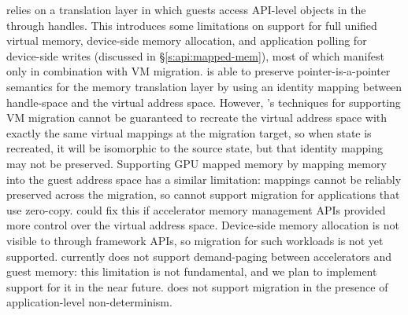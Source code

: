 \Model relies on a translation layer in which guests access API-level objects in the \worker through handles.
This introduces some limitations on support for full unified virtual memory, device-side memory allocation, and application polling for
device-side writes (discussed in \S\ref{s:api:mapped-mem}), most of which manifest only in combination with
VM migration.
\Model is able to preserve pointer-is-a-pointer semantics for the memory translation
layer by using an identity mapping between handle-space and the \worker virtual address space.
However, \model's techniques
for supporting VM migration cannot be guaranteed to recreate the \worker virtual address space with exactly the same virtual mappings at the migration target,
so when state is recreated, it will be isomorphic to the source state, but that identity mapping may not be preserved. Supporting GPU mapped memory by mapping \worker memory into the
guest address space has a similar limitation: mappings cannot be reliably preserved across the migration, so \model cannot support migration for applications that use zero-copy.
\Model could fix this if accelerator memory management APIs provided more control over the virtual address space.
Device-side memory allocation is not visible to \model through framework APIs, so migration for such workloads
is not yet supported. \Model currently does not support demand-paging between accelerators and guest memory: this
limitation is not fundamental, and we plan to implement support for it in the near future.
\Model does not support migration in the presence of application-level non-determinism. %



